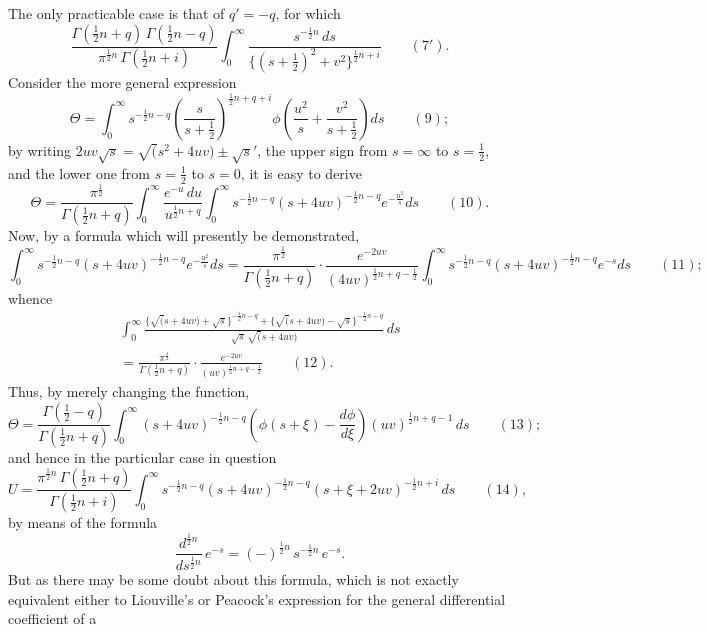 \documentclass[11pt,a4paper]{book}
\begin{document}
\newpage
The only practicable case is that of $q' = -q$, for which
\[
\frac{\Gamma(\frac{1}{2}n+q)\,\Gamma(\frac{1}{2}n-q)}{\pi^{\frac{1}{2}n}\,\Gamma(\frac{1}{2}n+i)} \int_0^\infty \frac{s^{-\frac{1}{2}n}\,ds}{\{(s+\frac{1}{2})^2 + v^2\}^{\frac{1}{2}n+i}} \qquad(7').
\]
Consider the more general expression
\[
\Theta = \int_0^\infty s^{-\frac{1}{2}n-q} \left(\frac{s}{s+\frac{1}{2}}\right)^{\frac{1}{2}n+q+i} \phi\left(\frac{u^2}{s} + \frac{v^2}{s+\frac{1}{2}}\right) ds \qquad(9);
\]
by writing $2uv\surd s = \surd(s^2 + 4uv) \pm \surd s'$,
the upper sign from $s = \infty$ to $s = \frac{1}{2}$, and the lower one from $s = \frac{1}{2}$ to $s = 0$, it is easy to derive
\[
\Theta = \frac{\pi^{\frac{1}{2}}}{\Gamma(\frac{1}{2}n+q)} \int_0^\infty \frac{e^{-u}\,du}{u^{\frac{1}{2}n+q}} \int_0^\infty s^{-\frac{1}{2}n-q} (s+4uv)^{-\frac{1}{2}n-q} e^{-\frac{u^2}{s}} ds \qquad(10).
\]
Now, by a formula which will presently be demonstrated,
\[
\int_0^\infty s^{-\frac{1}{2}n-q} (s+4uv)^{-\frac{1}{2}n-q} e^{-\frac{u^2}{s}} ds = \frac{\pi^{\frac{1}{2}}}{\Gamma(\frac{1}{2}n+q)} \cdot \frac{e^{-2uv}}{(4uv)^{\frac{1}{2}n+q-\frac{1}{2}}} \int_0^\infty s^{-\frac{1}{2}n-q} (s+4uv)^{-\frac{1}{2}n-q} e^{-s} ds \qquad(11);
\]
whence
\begin{multline*}
\int_0^\infty \frac{\{\surd(s+4uv) + \surd s\}^{-\frac{1}{2}n-q} + \{\surd(s+4uv) - \surd s\}^{-\frac{1}{2}n-q}}{\surd s\,\surd(s+4uv)}\,ds \\
= \frac{\pi^{\frac{1}{2}}}{\Gamma(\frac{1}{2}n+q)} \cdot \frac{e^{-2uv}}{(uv)^{\frac{1}{2}n+q-\frac{1}{2}}} \qquad(12).
\end{multline*}
Thus, by merely changing the function,
\[
\Theta = \frac{\Gamma(\frac{1}{2}-q)}{\Gamma(\frac{1}{2}n+q)} \int_0^\infty (s+4uv)^{-\frac{1}{2}n-q} \left(\phi(s+\xi) - \frac{d\phi}{d\xi}\right) (uv)^{\frac{1}{2}n+q-1}\,ds \qquad(13);
\]
and hence in the particular case in question
\[
U = \frac{\pi^{\frac{1}{2}n}\,\Gamma(\frac{1}{2}n+q)}{\Gamma(\frac{1}{2}n+i)} \int_0^\infty s^{-\frac{1}{2}n-q} (s+4uv)^{-\frac{1}{2}n-q} (s+\xi+2uv)^{-\frac{1}{2}n+i}\,ds \qquad(14),
\]
by means of the formula
\[
\frac{d^{\frac{1}{2}n}}{ds^{\frac{1}{2}n}}\,e^{-s} = (-)^{\frac{1}{2}n}\,s^{-\frac{1}{2}n}\,e^{-s}.
\]
But as there may be some doubt about this formula, which is not exactly equivalent either to Liouville's or Peacock's expression for the general differential coefficient of a
\end{document}
